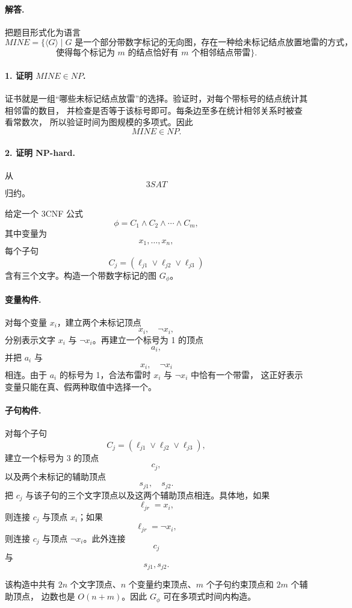 \begin{answerred}
\paragraph{解答.}
把题目形式化为语言
\[
MINE
=
\{\langle G\rangle \mid G \text{ 是一个部分带数字标记的无向图，存在一种给未标记结点放置地雷的方式，}
\]
\[
\text{使得每个标记为 }m\text{ 的结点恰好有 }m\text{ 个相邻结点带雷}\}.
\]

\paragraph{1. 证明 \(MINE\in NP\).}
证书就是一组“哪些未标记结点放雷”的选择。验证时，对每个带标号的结点统计其相邻雷的数目，
并检查是否等于该标号即可。每条边至多在统计相邻关系时被查看常数次，
所以验证时间为图规模的多项式。因此
\[
MINE\in NP.
\]

\paragraph{2. 证明 NP-hard.}
从
\[
3SAT
\]
归约。

给定一个 3CNF 公式
\[
\phi=C_1\wedge C_2\wedge\cdots\wedge C_m,
\]
其中变量为
\[
x_1,\dots,x_n,
\]
每个子句
\[
C_j=(\ell_{j1}\vee \ell_{j2}\vee \ell_{j3})
\]
含有三个文字。构造一个带数字标记的图 $G_\phi$。

\paragraph{变量构件.}
对每个变量 $x_i$，建立两个未标记顶点
\[
x_i,\quad \neg x_i,
\]
分别表示文字 $x_i$ 与 $\neg x_i$。再建立一个标号为 1 的顶点
\[
a_i,
\]
并把 $a_i$ 与
\[
x_i,\quad \neg x_i
\]
相连。由于 $a_i$ 的标号为 1，合法布雷时 $x_i$ 与 $\neg x_i$ 中恰有一个带雷，
这正好表示变量只能在真、假两种取值中选择一个。

\paragraph{子句构件.}
对每个子句
\[
C_j=(\ell_{j1}\vee \ell_{j2}\vee \ell_{j3}),
\]
建立一个标号为 3 的顶点
\[
c_j,
\]
以及两个未标记的辅助顶点
\[
s_{j1},\quad s_{j2}.
\]
把 $c_j$ 与该子句的三个文字顶点以及这两个辅助顶点相连。具体地，如果
\[
\ell_{jr}=x_i,
\]
则连接 $c_j$ 与顶点 $x_i$；如果
\[
\ell_{jr}=\neg x_i,
\]
则连接 $c_j$ 与顶点 $\neg x_i$。此外连接
\[
c_j
\]
与
\[
s_{j1},s_{j2}.
\]

该构造中共有 $2n$ 个文字顶点、$n$ 个变量约束顶点、$m$ 个子句约束顶点和 $2m$ 个辅助顶点，
边数也是 $O(n+m)$。因此 $G_\phi$ 可在多项式时间内构造。


\end{answerred}
